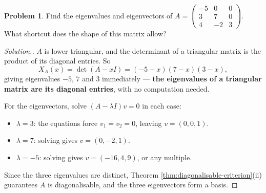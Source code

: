 \documentclass[11pt,a4paper]{article}
\theoremstyle{definition}
\newtheorem{problemx}{Problem}[section]
\newenvironment{problem}{\begin{problemx}}{\end{problemx}}
\newenvironment{solution}
  {\renewcommand{\qedsymbol}{}\begin{proof}[\textit{Solution}.]}
  {\end{proof}}
\begin{document}
\begin{problem}
Find the eigenvalues and eigenvectors of
$A=\begin{pmatrix}-5&0&0\\3&7&0\\4&-2&3\end{pmatrix}$. What shortcut does the
shape of this matrix allow?
\end{problem}
\begin{solution}
$A$ is lower triangular, and the determinant of a triangular matrix is the
product of its diagonal entries. So
$$X_A(x)=\det(A-xI)=(-5-x)(7-x)(3-x),$$
giving eigenvalues $-5$, $7$ and $3$ immediately --- \textbf{the eigenvalues of
a triangular matrix are its diagonal entries}, with no computation needed.

For the eigenvectors, solve $(A-\lambda I)v=0$ in each case:
\begin{itemize}
\item $\lambda=3$: the equations force $v_1=v_2=0$, leaving $v=(0,0,1)$.
\item $\lambda=7$: solving gives $v=(0,-2,1)$.
\item $\lambda=-5$: solving gives $v=(-16,4,9)$, or any multiple.
\end{itemize}
Since the three eigenvalues are distinct, Theorem
\ref{thm:diagonalisable-criterion}(ii) guarantees $A$ is diagonalisable, and
the three eigenvectors form a basis.
\end{solution}
\end{document}
